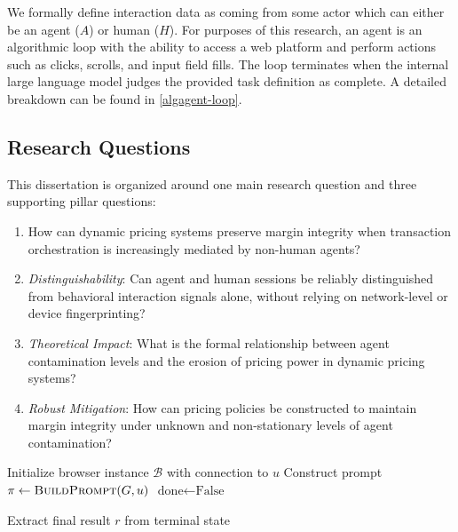 We formally define interaction data as coming from some actor which can either be an agent ($A$) or human ($H$). For purposes of this research, an agent is an algorithmic loop with the ability to access a web platform and perform actions such as clicks, scrolls, and input field fills. The loop terminates when the internal large language model judges the provided task definition as complete. A detailed breakdown can be found in \cref{algagent-loop}.

\subsection{Research Questions}
\label{sec:research_questions}

This dissertation is organized around one main research question and three supporting pillar questions:
\begin{enumerate}
    \item[\textbf{Main RQ}] How can dynamic pricing systems preserve margin integrity when transaction orchestration is increasingly mediated by non-human agents?
    \item[\textbf{SQ1}] \hypertarget{sq1}{}\textit{Distinguishability}: Can agent and human sessions be reliably distinguished from behavioral interaction signals alone, without relying on network-level or device fingerprinting?
    \item[\textbf{SQ2}] \hypertarget{sq2}{}\textit{Theoretical Impact}: What is the formal relationship between agent contamination levels and the erosion of pricing power in dynamic pricing systems?
    \item[\textbf{SQ3}] \hypertarget{sq3}{}\textit{Robust Mitigation}: How can pricing policies be constructed to maintain margin integrity under unknown and non-stationary levels of agent contamination?
\end{enumerate}


\begin{algorithm}[t]
\DontPrintSemicolon



Initialize browser instance $\mathcal{B}$ with connection to $u$\;
Construct prompt $\pi \gets \textsc{BuildPrompt}(G, u)$\;
$\text{done} \gets \text{False}$\;


Extract final result $r$ from terminal state\;
\;

\caption{AI Agent's Interaction Loop}
\label{algagent-loop}
\end{algorithm}


